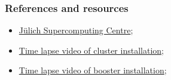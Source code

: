 \documentclass{beamer}
\begin{document}
\begin{frame}
  \frametitle{References and resources}
  \begin{itemize}
    \item \href{https://www.fz-juelich.de/ias/jsc/EN/Home/home_node.html}{Jülich Supercomputing Centre};
    \item \href{https://www.youtube.com/watch?v=7h6mYU2HDTA}{Time lapse video of cluster installation};
    \item \href{https://www.youtube.com/watch?v=S84vRFSc-vM}{Time lapse video of booster installation};
  \end{itemize}
\end{frame}
\end{document}
